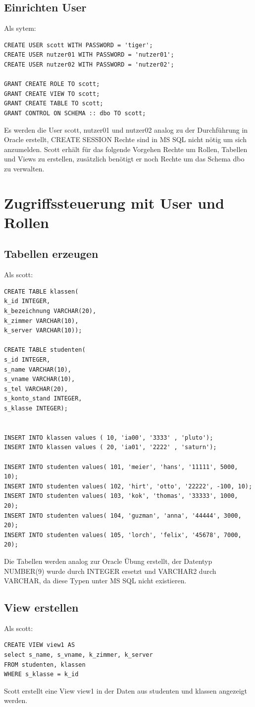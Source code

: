 \documentclass[10pt]{scrreprt}
\begin{document}
\subsection{Einrichten User}
Als sytem:
\begin{lstlisting}[style=sql]
CREATE USER scott WITH PASSWORD = 'tiger';
CREATE USER nutzer01 WITH PASSWORD = 'nutzer01';
CREATE USER nutzer02 WITH PASSWORD = 'nutzer02';

GRANT CREATE ROLE TO scott;
GRANT CREATE VIEW TO scott;
GRANT CREATE TABLE TO scott;
GRANT CONTROL ON SCHEMA :: dbo TO scott;
\end{lstlisting}
Es werden die User scott, nutzer01 und nutzer02 analog zu der Durchführung in Oracle erstellt, CREATE SESSION Rechte sind in MS SQL nicht nötig um sich anzumelden. Scott erhält für das folgende Vorgehen Rechte um Rollen, Tabellen und Views zu erstellen, zusätzlich benötigt er noch Rechte um das Schema dbo zu verwalten.

\section{Zugriffssteuerung mit User und Rollen}
\subsection{Tabellen erzeugen}
Als scott:
\begin{lstlisting}[style=sql]
CREATE TABLE klassen(
k_id INTEGER,
k_bezeichnung VARCHAR(20),
k_zimmer VARCHAR(10),
k_server VARCHAR(10));

CREATE TABLE studenten(
s_id INTEGER,
s_name VARCHAR(10),
s_vname VARCHAR(10),
s_tel VARCHAR(20),
s_konto_stand INTEGER,
s_klasse INTEGER);


INSERT INTO klassen values ( 10, 'ia00', '3333' , 'pluto');
INSERT INTO klassen values ( 20, 'ia01', '2222' , 'saturn');

INSERT INTO studenten values( 101, 'meier', 'hans', '11111', 5000, 10);
INSERT INTO studenten values( 102, 'hirt', 'otto', '22222', -100, 10);
INSERT INTO studenten values( 103, 'kok', 'thomas', '33333', 1000, 20);
INSERT INTO studenten values( 104, 'guzman', 'anna', '44444', 3000, 20);
INSERT INTO studenten values( 105, 'lorch', 'felix', '45678', 7000, 20);
\end{lstlisting}
Die Tabellen werden analog zur Oracle Übung erstellt, der Datentyp NUMBER(9) wurde durch INTEGER ersetzt und VARCHAR2 durch VARCHAR, da diese Typen unter MS SQL nicht existieren.
\subsection{View erstellen}
Als scott:
\begin{lstlisting}[style=sql]
CREATE VIEW view1 AS
select s_name, s_vname, k_zimmer, k_server
FROM studenten, klassen
WHERE s_klasse = k_id
\end{lstlisting}
Scott erstellt eine View view1 in der Daten aus studenten und klassen angezeigt werden.
\end{document}
